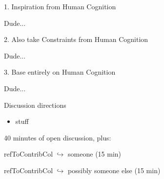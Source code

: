 \documentclass[compress]{beamer}
\newcommand{\refToContrib}[1]{%
    \begin{beamercolorbox}[wd=\linewidth,ht=2ex,dp=0.7ex]{refToContribCol}%
    \hspace{0.5em}$\hookrightarrow$ #1%
    \end{beamercolorbox}%
}%
\begin{document}





\begin{frame}{1. Inspiration from Human Cognition}

	Dude...

\end{frame}


\begin{frame}{2. Also take Constraints from Human Cognition}

	Dude...

\end{frame}


\begin{frame}{3. Base entirely on Human Cognition}

	Dude...

\end{frame}


\begin{frame}{Discussion directions}
    

    \begin{itemize}
        \item stuff
    \end{itemize}

    40 minutes of open discussion, plus:
    \refToContrib{someone (15 min)}
    \refToContrib{possibly someone else (15 min)}

\end{frame}
\end{document}
